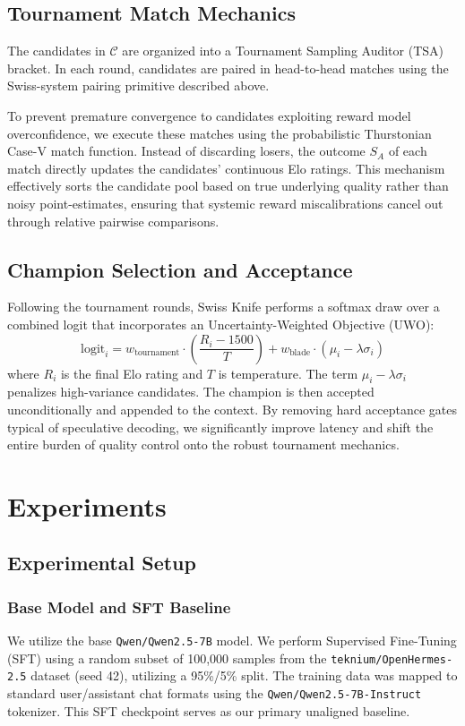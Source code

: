 \documentclass[letterpaper]{article} %
\begin{document}
\subsection{Tournament Match Mechanics}
The candidates in $\mathcal{C}$ are organized into a Tournament Sampling Auditor (TSA) bracket. In each round, candidates are paired in head-to-head matches using the Swiss-system pairing primitive described above. 

To prevent premature convergence to candidates exploiting reward model overconfidence, we execute these matches using the probabilistic Thurstonian Case-V match function. Instead of discarding losers, the outcome $S_A$ of each match directly updates the candidates' continuous Elo ratings. This mechanism effectively sorts the candidate pool based on true underlying quality rather than noisy point-estimates, ensuring that systemic reward miscalibrations cancel out through relative pairwise comparisons.

\subsection{Champion Selection and Acceptance}
Following the tournament rounds, Swiss Knife performs a softmax draw over a combined logit that incorporates an Uncertainty-Weighted Objective (UWO):
\[
\text{logit}_i = w_{\text{tournament}} \cdot (\frac{R_i - 1500}{T}) + w_{\text{blade}} \cdot (\mu_i - \lambda\sigma_i)
\]
where $R_i$ is the final Elo rating and $T$ is temperature. The term $\mu_i - \lambda\sigma_i$ penalizes high-variance candidates. The champion is then accepted unconditionally and appended to the context. By removing hard acceptance gates typical of speculative decoding, we significantly improve latency and shift the entire burden of quality control onto the robust tournament mechanics.

\section{Experiments}
\label{sec:experiments}

\subsection{Experimental Setup}

\subsubsection{Base Model and SFT Baseline}
We utilize the base \texttt{Qwen/Qwen2.5-7B} model. We perform Supervised Fine-Tuning (SFT) using a random subset of 100,000 samples from the \texttt{teknium/OpenHermes-2.5} dataset (seed 42), utilizing a 95\%/5\% split. The training data was mapped to standard user/assistant chat formats using the \texttt{Qwen/Qwen2.5-7B-Instruct} tokenizer. This SFT checkpoint serves as our primary unaligned baseline.
\end{document}
